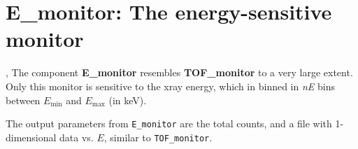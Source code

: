 \section{E\_monitor: The energy-sensitive monitor} \label{s:E_monitor}
,{}
The component \textbf{E\_monitor} resembles \textbf{TOF\_monitor}
to a very large extent. Only this monitor is sensitive to
the xray energy, which in binned in \textit{nE} bins between
$E_\mathrm{min}$ and $E_\mathrm{max}$ (in keV).

The output parameters from \texttt{E\_monitor} are the total counts,
and a file with 1-dimensional data vs. $E$, similar to \texttt{TOF\_monitor}.


